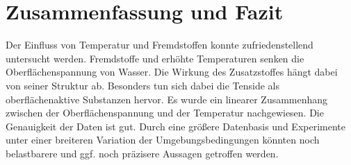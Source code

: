 \section{Zusammenfassung und Fazit}
\label{sec:zusammenfassung}

Der Einfluss von Temperatur und Fremdstoffen konnte zufriedenstellend untersucht werden. Fremdstoffe und erhöhte Temperaturen senken die Oberflächenspannung von Wasser. Die Wirkung des Zusatzstoffes hängt dabei von seiner Struktur ab. Besonders tun sich dabei die Tenside als oberflächenaktive Substanzen hervor. Es wurde ein linearer Zusammenhang zwischen der Oberflächenspannung und der Temperatur nachgewiesen. Die Genauigkeit der Daten ist gut. Durch eine größere Datenbasis und Experimente unter einer breiteren Variation der Umgebungsbedingungen könnten noch belastbarere und ggf. noch präzisere Aussagen getroffen werden.